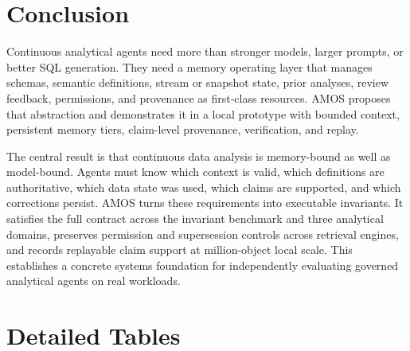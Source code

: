 \documentclass[sigconf,nonacm]{acmart}
\newcommand{\amos}{\textsc{AMOS}\xspace}
\begin{document}
\section{Conclusion}

Continuous analytical agents need more than stronger models, larger prompts, or better SQL generation. They need a memory operating layer that manages schemas, semantic definitions, stream or snapshot state, prior analyses, review feedback, permissions, and provenance as first-class resources. \amos proposes that abstraction and demonstrates it in a local prototype with bounded context, persistent memory tiers, claim-level provenance, verification, and replay.

The central result is that continuous data analysis is memory-bound as well as model-bound. Agents must know which context is valid, which definitions are authoritative, which data state was used, which claims are supported, and which corrections persist. \amos turns these requirements into executable invariants. It satisfies the full contract across the invariant benchmark and three analytical domains, preserves permission and supersession controls across retrieval engines, and records replayable claim support at million-object local scale. This establishes a concrete systems foundation for independently evaluating governed analytical agents on real workloads.

\appendix
\section{Detailed Tables}
\setcounter{table}{0}
\renewcommand{\thetable}{A\arabic{table}}
\renewcommand{\theHtable}{A\arabic{table}}
\end{document}
